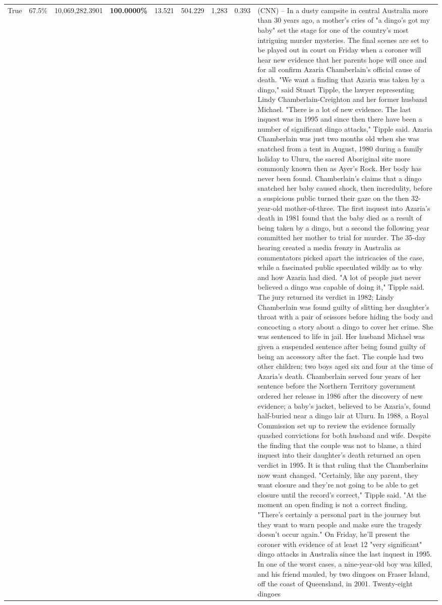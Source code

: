 \begin{table}[H]
\begin{tabular}{lllrlllll}
True & 67.5\% & 10,069,282.3901 & \bfseries \color{red} 100.0000\% & 13.521 & 504.229 & 1,283 & 0.393 & (CNN) -- In a dusty campsite in central Australia more than 30 years ago, a mother's cries of "a dingo's got my baby" set the stage for one of the country's most intriguing murder mysteries. The final scenes are set to be played out in court on Friday when a coroner will hear new evidence that her parents hope will once and for all confirm Azaria Chamberlain's official cause of death. "We want a finding that Azaria was taken by a dingo," said Stuart Tipple, the lawyer representing Lindy Chamberlain-Creighton and her former husband Michael. "There is a lot of new evidence. The last inquest was in 1995 and since then there have been a number of significant dingo attacks," Tipple said. Azaria Chamberlain was just two months old when she was snatched from a tent in August, 1980 during a family holiday to Uluru, the sacred Aboriginal site more commonly known then as Ayer's Rock. Her body has never been found. Chamberlain's claims that a dingo snatched her baby caused shock, then incredulity, before a suspicious public turned their gaze on the then 32-year-old mother-of-three. The first inquest into Azaria's death in 1981 found that the baby died as a result of being taken by a dingo, but a second the following year committed her mother to trial for murder. The 35-day hearing created a media frenzy in Australia as commentators picked apart the intricacies of the case, while a fascinated public speculated wildly as to why and how Azaria had died. "A lot of people just never believed a dingo was capable of doing it," Tipple said. The jury returned its verdict in 1982; Lindy Chamberlain was found guilty of slitting her daughter's throat with a pair of scissors before hiding the body and concocting a story about a dingo to cover her crime. She was sentenced to life in jail. Her husband Michael was given a suspended sentence after being found guilty of being an accessory after the fact. The couple had two other children; two boys aged six and four at the time of Azaria's death. Chamberlain served four years of her sentence before the Northern Territory government ordered her release in 1986 after the discovery of new evidence; a baby's jacket, believed to be Azaria's, found half-buried near a dingo lair at Uluru. In 1988, a Royal Commission set up to review the evidence formally quashed convictions for both husband and wife. Despite the finding that the couple was not to blame, a third inquest into their daughter's death returned an open verdict in 1995. It is that ruling that the Chamberlains now want changed. "Certainly, like any parent, they want closure and they're not going to be able to get closure until the record's correct," Tipple said. "At the moment an open finding is not a correct finding. "There's certainly a personal part in the journey but they want to warn people and make sure the tragedy doesn't occur again." On Friday, he'll present the coroner with evidence of at least 12 "very significant" dingo attacks in Australia since the last inquest in 1995. In one of the worst cases, a nine-year-old boy was killed, and his friend mauled, by two dingoes on Fraser Island, off the coast of Queensland, in 2001. Twenty-eight dingoes 
\end{tabular}
\end{table}
